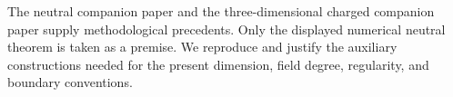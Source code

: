 The neutral companion paper \cite{NeutralV6S74} and the three-dimensional charged companion paper \cite{ChargedV6S818} supply methodological precedents. Only the displayed numerical neutral theorem is taken as a premise. We reproduce and justify the auxiliary constructions needed for the present dimension, field degree, regularity, and boundary conventions.
